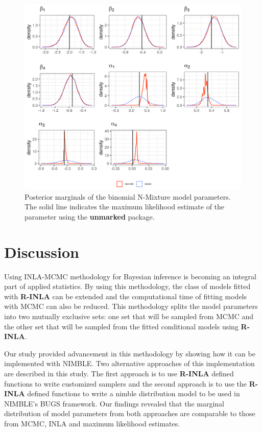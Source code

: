 \documentclass[
]{article}
\begin{document}
\begin{figure}

{\centering \includegraphics{results/binNmix.png}

}

\caption{\label{fig-binNmixPlot}Posterior marginals of the binomial
N-Mixture model parameters. The solid line indicates the maximum
likelihood estimate of the parameter using the \textbf{unmarked}
package.}

\end{figure}

\hypertarget{discussion}{%
\section{Discussion}\label{discussion}}

Using INLA-MCMC methodology for Bayesian inference is becoming an
integral part of applied statistics. By using this methodology, the
class of models fitted with \textbf{R-INLA} can be extended and the
computational time of fitting models with MCMC can also be reduced. This
methodology splits the model parameters into two mutually exclusive
sets: one set that will be sampled from MCMC and the other set that will
be sampled from the fitted conditional models using \textbf{R-INLA}.

Our study provided advancement in this methodology by showing how it can
be implemented with NIMBLE. Two alternative approaches of this
implementation are described in this study. The first approach is to use
\textbf{R-INLA} defined functions to write customized samplers and the
second approach is to use the \textbf{R-INLA} defined functions to write
a nimble distribution model to be used in NIMBLE's BUGS framework. Our
findings revealed that the marginal distribution of model parameters
from both approaches are comparable to those from MCMC, INLA and maximum
likelihood estimates.
\end{document}
